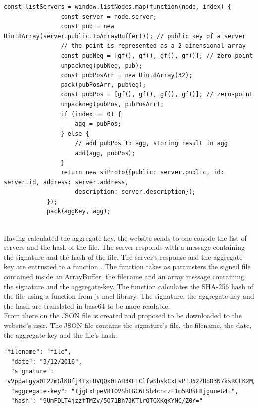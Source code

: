 \documentclass[11pt, a4paper, twoside, openright]{book} %
\begin{document}
\begin{lstlisting}[caption={Extract of the code calculating the aggregate-key}, captionpos=b]
  const listServers = window.listNodes.map(function(node, index) {
                const server = node.server;
                const pub = new Uint8Array(server.public.toArrayBuffer()); // public key of a server
                // the point is represented as a 2-dimensional array
                const pubNeg = [gf(), gf(), gf(), gf()]; // zero-point
                unpackneg(pubNeg, pub);
                const pubPosArr = new Uint8Array(32);
                pack(pubPosArr, pubNeg);
                const pubPos = [gf(), gf(), gf(), gf()]; // zero-point
                unpackneg(pubPos, pubPosArr);
                if (index == 0) {
                    agg = pubPos;
                } else {
                    // add pubPos to agg, storing result in agg
                    add(agg, pubPos);
                }
                return new siProto({public: server.public, id: server.id, address: server.address,
                    description: server.description});
            });
            pack(aggKey, agg);
\end{lstlisting}
\leavevmode \\

Having calculated the aggregate-key, the website sends to one conode the list of servers
and the hash of the file. The server responds with a message containing the signature
and the hash of the file. The server's response and the aggregate-key are entrusted to a function .
The function takes as parameters the signed file contained inside an ArrayBuffer,
the filename and an array message containing the signature and the aggregate-key.
The function calculates the SHA-256 hash of the file using a function from js-nacl library.
The signature, the aggregate-key and the hash are translated in base64 to be more readable.\\

From there on the JSON file is created and proposed to be downloaded to the website's user.
The JSON file contains the signature's file, the filename, the date, the aggregate-key and the file's hash.\\

\begin{lstlisting}[caption={Example a downloadable JSON file}, captionpos=b]
  "filename": "file",
  "date": "3/12/2016",
  "signature": "vVppwEgya0T22mGlKBfj4Tx+BVQQx0EAH3XFLClfwSbskCxEsPIJ62ZUoD3N7ksRCEK2M/XA6flV2tLsiQmrAf4=",
  "aggregate-key": "IjgFxLpeV8IOVShIGC6ESh4cnczF1m5RRSE8jguueG4=",
  "hash": "9UmFDLT4jzzfTMZv/5O71Bh73KTlrOTQXKgKYNC/Z0Y="
\end{lstlisting}
\leavevmode \\
\end{document}
